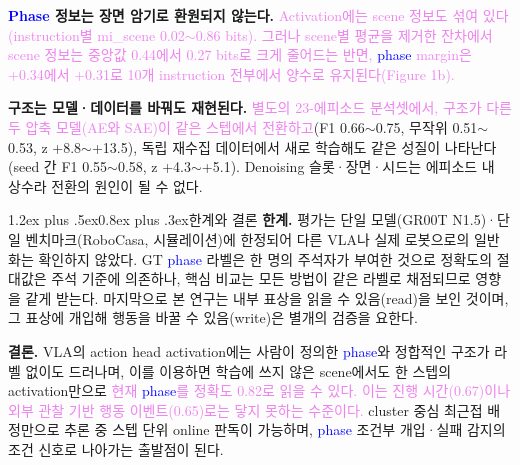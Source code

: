 \documentclass[a4paper,twocolumn,9pt]{extarticle}
\makeatletter
\newcommand{\term}[1]{\textcolor{blue}{#1}}  %
\newcommand{\rev}[1]{\textcolor{violet}{#1}}  %
\renewcommand\section{\@startsection{section}{1}{\z@}%
  {1.2ex plus .5ex}{0.8ex plus .3ex}{\normalsize\bfseries}}
\makeatother
\begin{document}
\textbf{\term{Phase} 정보는 장면 암기로 환원되지 않는다.} \rev{Activation에는 scene 정보도 섞여 있다(instruction별 mi\_scene 0.02$\sim$0.86 bits). 그러나 scene별 평균을 제거한 잔차에서 scene 정보는 중앙값 0.44에서 0.27 bits로 크게 줄어드는 반면, \term{phase} margin은 +0.34에서 +0.31로 10개 instruction 전부에서 양수로 유지된다(Figure 1b).}

\textbf{구조는 모델·데이터를 바꿔도 재현된다.} \rev{별도의 23-에피소드 분석셋에서, 구조가 다른 두 압축 모델(AE와 SAE)이 같은 스텝에서 전환하고}(F1 0.66$\sim$0.75, 무작위 0.51$\sim$0.53, z +8.8$\sim$+13.5), 독립 재수집 데이터에서 새로 학습해도 같은 성질이 나타난다(seed 간 F1 0.55$\sim$0.58, z +4.3$\sim$+5.1). Denoising 슬롯·장면·시드는 에피소드 내 상수라 전환의 원인이 될 수 없다.



\section{한계와 결론}
\textbf{한계.} 평가는 단일 모델(GR00T N1.5)·단일 벤치마크(RoboCasa, 시뮬레이션)에 한정되어 다른 VLA나 실제 로봇으로의 일반화는 확인하지 않았다. GT \term{phase} 라벨은 한 명의 주석자가 부여한 것으로 정확도의 절대값은 주석 기준에 의존하나, 핵심 비교는 모든 방법이 같은 라벨로 채점되므로 영향을 같게 받는다. 마지막으로 본 연구는 내부 표상을 읽을 수 있음(read)을 보인 것이며, 그 표상에 개입해 행동을 바꿀 수 있음(write)은 별개의 검증을 요한다.

\textbf{결론.} VLA의 action head activation에는 사람이 정의한 \term{phase}와 정합적인 구조가 라벨 없이도 드러나며, 이를 이용하면 학습에 쓰지 않은 scene에서도 한 스텝의 activation만으로 \rev{현재 \term{phase}를 정확도 0.82로 읽을 수 있다. 이는 진행 시간(0.67)이나 외부 관찰 기반 행동 이벤트(0.65)로는 닿지 못하는 수준이다.} cluster 중심 최근접 배정만으로 추론 중 스텝 단위 online 판독이 가능하며, \term{phase} 조건부 개입·실패 감지의 조건 신호로 나아가는 출발점이 된다.

\end{document}
